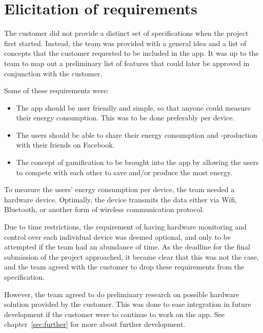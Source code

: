 \section{Elicitation of requirements}
\label{sec:obtainingreq}

The customer did not provide a distinct set of specifications when the project first started. Instead, the team was provided with a general idea and a list of concepts that the customer requested to be included in the app. It was up to the team to map out a preliminary list of features that could later be approved in conjunction with the customer. 

Some of these requirements were:
\begin{itemize}
\item The app should be user friendly and simple, so that anyone could measure their energy consumption. This was to be done preferably per device. 
\item The users should be able to share their energy consumption and -production with their friends on Facebook. 
\item The concept of \gls{gamification} to be brought into the app by allowing the users to compete with each other to save and/or produce the most energy. 
\end{itemize}

\noindent To measure the users' energy consumption per device, the team needed a hardware device. Optimally, the device transmits the data either via Wifi, Bluetooth, or another form of wireless communication protocol.

Due to time restrictions, the requirement of having hardware monitoring and control over each individual device was deemed optional, and only to be attempted if the team had an abundance of time. As the deadline for the final submission of the project approached, it became clear that this was not the case, and the team agreed with the customer to drop these requirements from the specification. 

However, the team agreed to do preliminary research on possible hardware solution provided by the customer. This was done to ease integration in future development if the customer were to continue to work on the app. See chapter~\ref{sec:further} for more about further development.
 
